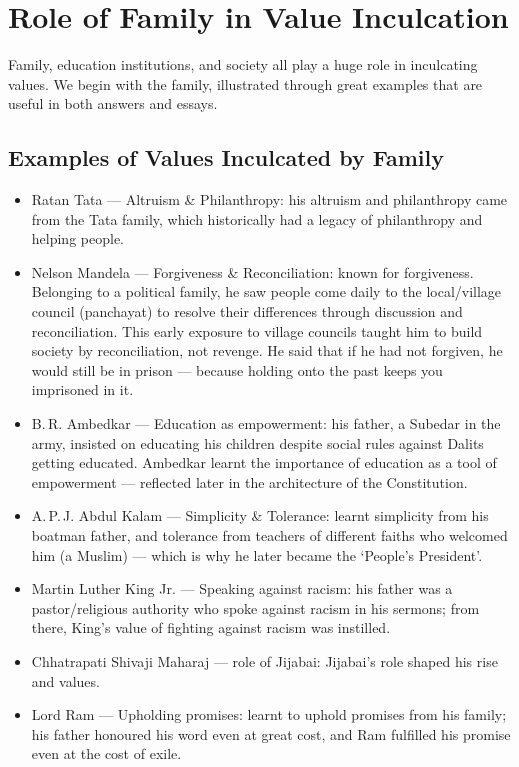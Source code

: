 \section{Role of Family in Value Inculcation}

Family, education institutions, and society all play a huge role in inculcating values. We begin with the family, illustrated through great examples that are useful in both answers and essays.

\subsection{Examples of Values Inculcated by Family}

\begin{itemize}
\item Ratan Tata --- Altruism \& Philanthropy: his altruism and philanthropy came from the Tata family, which historically had a legacy of philanthropy and helping people.
\item Nelson Mandela --- Forgiveness \& Reconciliation: known for forgiveness. Belonging to a political family, he saw people come daily to the local/village council (panchayat) to resolve their differences through discussion and reconciliation. This early exposure to village councils taught him to build society by reconciliation, not revenge. He said that if he had not forgiven, he would still be in prison --- because holding onto the past keeps you imprisoned in it.
\item B.\,R. Ambedkar --- Education as empowerment: his father, a Subedar in the army, insisted on educating his children despite social rules against Dalits getting educated. Ambedkar learnt the importance of education as a tool of empowerment --- reflected later in the architecture of the Constitution.
\item A.\,P.\,J. Abdul Kalam --- Simplicity \& Tolerance: learnt simplicity from his boatman father, and tolerance from teachers of different faiths who welcomed him (a Muslim) --- which is why he later became the `People's President'.
\item Martin Luther King Jr. --- Speaking against racism: his father was a pastor/religious authority who spoke against racism in his sermons; from there, King's value of fighting against racism was instilled.
\item Chhatrapati Shivaji Maharaj --- role of Jijabai: Jijabai's role shaped his rise and values.
\item Lord Ram --- Upholding promises: learnt to uphold promises from his family; his father honoured his word even at great cost, and Ram fulfilled his promise even at the cost of exile.
\end{itemize}

